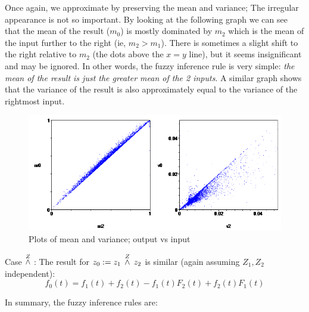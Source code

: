Once again, we approximate by preserving the mean and variance; The irregular appearance is not so important.  By looking at the following graph we can see that the mean of the result ($m_0$) is mostly dominated by $m_2$ which is the mean of the input further to the right (ie, $m_2 > m_1$).  There is sometimes a slight shift to the right relative to $m_2$ (the dots above the $x=y$ line), but it seems insignificant and may be ignored.  In other words, the fuzzy inference rule is very simple:  \textit{the mean of the result is just the greater mean of the 2 inputs}.  A similar graph shows that the variance of the result is also approximately equal to the variance of the rightmost input.
\begin{figure}[H]
\centering
\includegraphics[scale=0.8]{z1-OR-z2-M-and-V-plots.png}
\caption{Plots of mean and variance; output vs input}
\end{figure}

Case $\stackrel{Z}{\wedge}$ : The result for $z_0 := z_1 \, \stackrel{Z}{\wedge} \, z_2$ is similar (again assuming $Z_1, Z_2$ independent):
\begin{equation}
f_0(t) = f_1(t) + f_2(t) - f_1(t) F_2(t) + f_2(t) F_1(t)
\end{equation}

In summary, the fuzzy inference rules are:

